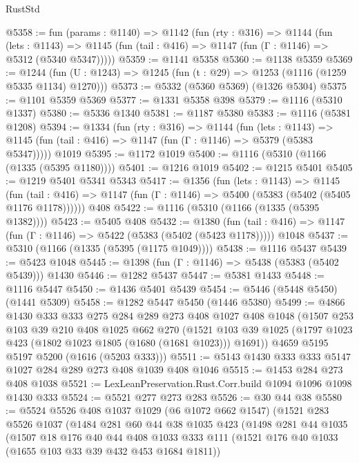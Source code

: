 \begin{lexlean}{RustStd}
\begin{coremodule}
{\begin{coremodule}
{{{{{{{{{{{@5358 := fun (params : @1140) =>
  @1142
    (fun (rty : @316) =>
    @1144
      (fun (lets : @1143) =>
      @1145 (fun (tail : @416) => @1147 (fun (Γ : @1146) => @5312 (@5340 @5347)))))
@5359 := @1141 @5358
@5360 := @1138 @5359
@5369 := @1244 (fun (U : @1243) => @1245 (fun (t : @29) => @1253 (@1116 (@1259 @5335 @1134) @1270)))
@5373 := @5332 (@5360 @5369) (@1326 @5304)
@5375 := @1101 @5359 @5369
@5377 := @1331 @5358 @398
@5379 := @1116 (@5310 @1337)
@5380 := @5336 @1340
@5381 := @1187 @5380
@5383 := @1116 (@5381 @1208)
@5394 := @1334
    (fun (rty : @316) =>
    @1144
      (fun (lets : @1143) =>
      @1145 (fun (tail : @416) => @1147 (fun (Γ : @1146) => @5379 (@5383 @5347)))))
    @1019
@5395 := @1172 @1019
@5400 := @1116 (@5310 (@1166 (@1335 (@5395 @1180))))
@5401 := @1216 @1019
@5402 := @1215 @5401
@5405 := @1219 @5401 @5341 @5343
@5417 := @1356
    (fun (lets : @1143) =>
    @1145
      (fun (tail : @416) => @1147 (fun (Γ : @1146) => @5400 (@5383 (@5402 (@5405 @1176 @1178))))))
    @408
@5422 := @1116 (@5310 (@1166 (@1335 (@5395 @1382))))
@5423 := @5405 @408
@5432 := @1380
    (fun (tail : @416) => @1147 (fun (Γ : @1146) => @5422 (@5383 (@5402 (@5423 @1178)))))
    @1048
@5437 := @5310 (@1166 (@1335 (@5395 (@1175 @1049))))
@5438 := @1116 @5437
@5439 := @5423 @1048
@5445 := @1398 (fun (Γ : @1146) => @5438 (@5383 (@5402 @5439))) @1430
@5446 := @1282 @5437
@5447 := @5381 @1433
@5448 := @1116 @5447
@5450 := @1436 @5401 @5439
@5454 := @5446 (@5448 @5450) (@1441 @5309)
@5458 := @1282 @5447 @5450 (@1446 @5380)
@5499 := @4866
    @1430
    @333
    @333
    @275
    @284
    @289
    @273
    @408
    @1027
    @408
    @1048
    (@1507
      @253
      @103
      @39
      @210
      @408
      @1025
      @662
      @270
      (@1521 @103 @39 @1025 (@1797 @1023 @423 (@1802 @1023 @1805 (@1680 (@1681 @1023))) @1691))
      @4659
      @5195
      @5197
      @5200
      (@1616 (@5203 @333)))
@5511 := @5143 @1430 @333 @333 @5147 @1027 @284 @289 @273 @408 @1039 @408 @1046
@5515 := @1453 @284 @273 @408 @1038
@5521 := LexLeanPreservation.Rust.Corr.build @1094 @1096 @1098 @1430 @333
@5524 := @5521 @277 @273 @283
@5526 := @30 @44 @38
@5580 := @5524
    @5526
    @408
    @1037
    @1029
    (@6 @1072 @662 @1547)
    (@1521
      @283
      @5526
      @1037
      (@1484
        @281
        @60
        @44
        @38
        @1035
        @423
        (@1498
          @281
          @44
          @1035
          (@1507
            @18
            @176
            @40
            @44
            @408
            @1033
            @333
            @111
            (@1521 @176 @40 @1033 (@1655 @103 @33 @39 @432 @453 @1684 @1811))
}}}}}}}}}}}
\end{coremodule}}
\end{coremodule}
\end{lexlean}
